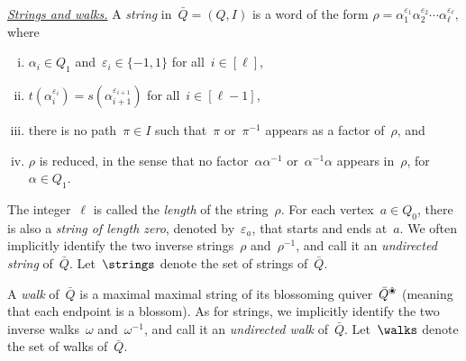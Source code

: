 \documentclass{amsart}
\theoremstyle{definition}
\newcommand{\eqdef}{\mbox{\,\raisebox{0.2ex}{\scriptsize\ensuremath{\mathrm:}}\ensuremath{=}\,}} %
\newcommand{\darkblue}{\color{darkblue}} %
\newcommand{\defn}[1]{\textsl{\darkblue #1}} %
\newcommand{\para}[1]{\medskip\noindent\uline{\textit{#1.}}} %
\newcommand{\quiver}{\bar Q} %
\newcommand{\blossom}{^\text{\ding{96}}} %
\begin{document}
\para{Strings and walks}
%
A \defn{string} in~$\quiver = (Q,I)$ is a word of the form
\(
\rho = \alpha_1^{\varepsilon_1}\alpha_2^{\varepsilon_2}\cdots \alpha_\ell^{\varepsilon_\ell},
\)
where
	\begin{enumerate}[(i)]
	\item $\alpha_i \in Q_1$ and~$\varepsilon_i \in \{-1,1\}$ for all~$i \in [\ell]$,
	\item $t(\alpha_i^{\varepsilon_i}) = s(\alpha_{i+1}^{\varepsilon_{i+1}})$ for all~$i \in [\ell-1]$,
	\item there is no path~$\pi \in I$ such that~$\pi$ or~$\pi^{-1}$ appears as a factor of~$\rho$, and
	\item $\rho$ is reduced, in the sense that no factor~$\alpha\alpha^{-1}$ or~$\alpha^{-1}\alpha$ appears in~$\rho$, for~$\alpha \in Q_1$.
	\end{enumerate}
The integer~$\ell$ is called the \defn{length} of the string~$\rho$.
For each vertex~$a \in Q_0$, there is also a \defn{string of length zero}, denoted by~$\varepsilon_a$, that starts and ends at~$a$.
We often implicitly identify the two inverse strings~$\rho$ and~$\rho^{-1}$, and call it an \defn{undirected string} of~$\quiver$.
Let~$\strings$ denote the set of strings of~$\quiver$.

A \defn{walk} of~$\quiver$ is a maximal maximal string of its blossoming quiver~$\quiver\blossom$ (meaning that each endpoint is a blossom).
As for strings, we implicitly identify the two inverse walks~$\omega$ and~$\omega^{-1}$, and call it an \defn{undirected walk} of~$\quiver$.
Let~$\walks$ denote the set of walks of~$\quiver$.
\end{document}
